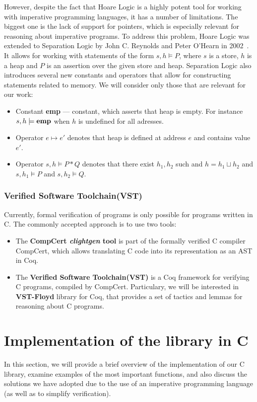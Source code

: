 \documentclass[14pt]{constructor-diploma}
\begin{document}
However, despite the fact that Hoare Logic is a highly potent tool for working with imperative programming languages, 
it has a number of limitations. The biggest one is the lack of support for pointers, 
which is especially relevant for reasoning about imperative programs. To address this problem, 
Hoare Logic was extended to Separation Logic by John C. Reynolds and Peter O'Hearn in 2002~\cite{reynolds}. 
It allows for working with statements of the form $s, h \models P$, where $s$ is a store, $h$ is a heap and 
$P$ is an assertion over the given store and heap.
Separation Logic also introduces several new constants and operators that allow for constructing
statements related to memory. We will consider only those that are relevant for our work:
\begin{itemize}
  \item Constant \textbf{emp} --- constant, which asserts that heap is empty. For instance
  $s, h \models \bf{emp}$ when $h$ is undefined for all adresses.
  \item Operator $e \mapsto e'$ denotes that heap is defined at address $e$ and contains value $e'$.
  \item Operator $s, h \models P * Q$ denotes that there exist $h_1, h_2$ such
  and $h = h_1 \sqcup h_2$ and $s, h_1 \models P$ and $s, h_2 \models Q$.
\end{itemize}

\subsubsection{Verified Software Toolchain(VST)}
Currently, formal verification of programs is only possible for programs written in C. 
The commonly accepted approach is to use two tools: 
\begin{itemize}
  \item The \textbf{CompCert \textit{clightgen} tool} is part of the formally verified C compiler CompCert, 
  which allows translating C code into its representation as an AST in Coq.
  \item The \textbf{Verified Software Toolchain(VST)} is a Coq framework for verifying C programs, compiled by CompCert.
  Particulary, we will be interested in \textbf{VST-Floyd} library for Coq, that provides a set of tactics and lemmas for reasoning about C programs.
\end{itemize}

\section{Implementation of the library in C}
In this section, we will provide a brief overview of the implementation of our C library, 
examine examples of the most important functions, 
and also discuss the solutions we have adopted due 
to the use of an imperative programming language (as well as to simplify verification).
\end{document}
